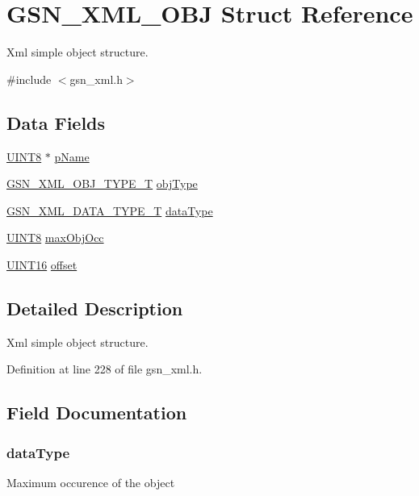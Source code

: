 \hypertarget{a00435}{
\section{GSN\_\-XML\_\-OBJ Struct Reference}
\label{a00435}
}


Xml simple object structure.  




{\ttfamily \#include $<$gsn\_\-xml.h$>$}

\subsection*{Data Fields}
\begin{DoxyCompactItemize}
\item 
\hyperlink{a00660_gab27e9918b538ce9d8ca692479b375b6a}{UINT8} $\ast$ \hyperlink{a00435_a9f24bc0b240cf182a580ac39c83e01bf}{pName}
\item 
\hyperlink{a00679_gaa26694299ab465dbf5806f74d06aedc9}{GSN\_\-XML\_\-OBJ\_\-TYPE\_\-T} \hyperlink{a00435_a8486ffe7e67969e74c4cf5f87193bac1}{objType}
\item 
\hyperlink{a00679_ga481bc889c92734a49552fb759166b14a}{GSN\_\-XML\_\-DATA\_\-TYPE\_\-T} \hyperlink{a00435_af2a9634e0e0ba430db8c2058c97c777e}{dataType}
\item 
\hyperlink{a00660_gab27e9918b538ce9d8ca692479b375b6a}{UINT8} \hyperlink{a00435_afd475a31316e41c556764d1ccfbfe1e6}{maxObjOcc}
\item 
\hyperlink{a00660_ga09f1a1fb2293e33483cc8d44aefb1eb1}{UINT16} \hyperlink{a00435_af7c1ea69079dc905761ed0a19ec036ab}{offset}
\end{DoxyCompactItemize}


\subsection{Detailed Description}
Xml simple object structure. 

Definition at line 228 of file gsn\_\-xml.h.



\subsection{Field Documentation}
\hypertarget{a00435_af2a9634e0e0ba430db8c2058c97c777e}{
\subsubsection[{dataType}]{ {\bf dataType}}}
\label{a00435_af2a9634e0e0ba430db8c2058c97c777e}
Maximum occurence of the object 

